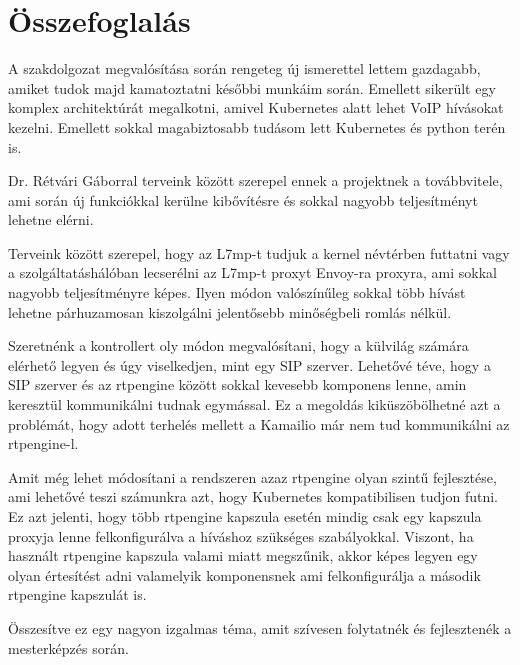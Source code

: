 \chapter{Összefoglalás}

A szakdolgozat megvalósítása során rengeteg új ismerettel lettem gazdagabb, 
amiket tudok majd kamatoztatni későbbi munkáim során. Emellett sikerült 
egy komplex architektúrát megalkotni, amivel Kubernetes alatt lehet 
VoIP hívásokat kezelni. Emellett sokkal magabiztosabb tudásom lett Kubernetes és 
python terén is. 

Dr. Rétvári Gáborral terveink között szerepel ennek a projektnek a továbbvitele, 
ami során új funkciókkal kerülne kibővítésre és sokkal nagyobb teljesítményt 
lehetne elérni. 

Terveink között szerepel, hogy az L7mp-t tudjuk a kernel névtérben futtatni vagy 
a szolgáltatáshálóban lecserélni az L7mp-t proxyt Envoy-ra proxyra, ami sokkal nagyobb teljesítményre képes. Ilyen módon valószínűleg sokkal több hívást lehetne párhuzamosan kiszolgálni jelentősebb minőségbeli romlás nélkül. 

Szeretnénk a kontrollert oly módon megvalósítani, hogy a külvilág számára elérhető
legyen és úgy viselkedjen, mint egy SIP szerver. Lehetővé téve, hogy a SIP szerver és az 
rtpengine között sokkal kevesebb komponens lenne, amin keresztül kommunikálni tudnak 
egymással. Ez a megoldás kiküszöbölhetné azt a problémát, hogy adott terhelés mellett a 
Kamailio már nem tud kommunikálni az rtpengine-l.

Amit még lehet módosítani a rendszeren azaz rtpengine olyan szintű fejlesztése, ami 
lehetővé teszi számunkra azt, hogy Kubernetes kompatibilisen tudjon futni. Ez azt jelenti,
hogy több rtpengine kapszula esetén mindig csak egy kapszula proxyja lenne felkonfigurálva
a híváshoz szükséges szabályokkal. Viszont, ha használt rtpengine kapszula valami miatt 
megszűnik, akkor képes legyen egy olyan értesítést adni valamelyik komponensnek ami 
felkonfigurálja a második rtpengine kapszulát is.

Összesítve ez egy nagyon izgalmas téma, amit szívesen folytatnék és fejlesztenék 
a mesterképzés során. 